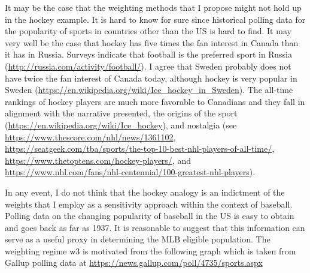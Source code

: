 \documentclass[11pt]{article}
\begin{document}
It may be the case that the weighting methods that I propose might not hold 
up in the hockey example.  It is hard to know for sure since historical 
polling data for the popularity of sports in countries other than the US is 
hard to find.  It may very well be the case that hockey has five times the 
fan interest in Canada than it has in Russia.  Surveys indicate that 
football is the preferred sport in Russia 
(\url{http://russia.com/activity/football/}).  I agree that 
Sweden probably does not have twice the fan interest of Canada today, 
although hockey is very popular in Sweden 
(\url{https://en.wikipedia.org/wiki/Ice_hockey_in_Sweden}).  
The all-time rankings of hockey players are much more favorable to 
Canadians and they fall in alignment with the narrative presented, 
the origins of the sport (\url{https://en.wikipedia.org/wiki/Ice_hockey}), 
and nostalgia (see
\url{https://www.thescore.com/nhl/news/1361102}, 
\url{https://seatgeek.com/tba/sports/the-top-10-best-nhl-players-of-all-time/}, 
\url{https://www.thetoptens.com/hockey-players/}, 
and 
\url{https://www.nhl.com/fans/nhl-centennial/100-greatest-nhl-players}).


In any event, I do not think that the hockey analogy is an indictment 
of the weights that I employ as a sensitivity approach within the context of 
baseball.  Polling data on the changing popularity of baseball in the US is 
easy to obtain and goes back as far as 1937.  It is reasonable to suggest 
that this information can serve as a useful proxy in determining the MLB 
eligible population.  The weighting regime w3 is motivated from the following 
graph which is taken from Gallup polling data at 
\url{https://news.gallup.com/poll/4735/sports.aspx}
\end{document}
